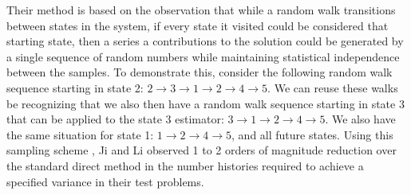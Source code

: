Their method is based on the observation that while a random walk
transitions between states in the system, if every state it visited
could be considered that starting state, then a series a contributions
to the solution could be generated by a single sequence of random
numbers while maintaining statistical independence between the
samples. To demonstrate this, consider the following random walk
sequence starting in state 2: $2 \rightarrow 3 \rightarrow 1
\rightarrow 2 \rightarrow 4 \rightarrow 5$. We can reuse these walks
be recognizing that we also then have a random walk sequence starting
in state 3 that can be applied to the state 3 estimator: $3
\rightarrow 1 \rightarrow 2 \rightarrow 4 \rightarrow 5$. We also have
the same situation for state 1: $1 \rightarrow 2 \rightarrow 4
\rightarrow 5$, and all future states. Using this sampling scheme , Ji
and Li observed 1 to 2 orders of magnitude reduction over the standard
direct method in the number histories required to achieve a specified
variance in their test problems.

